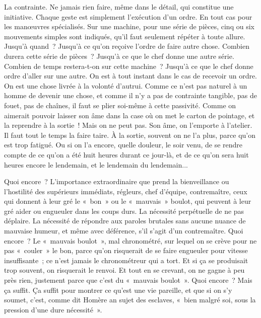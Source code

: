\documentclass[french,twoside]{book} %
\begin{document}
La contrainte. Ne jamais rien faire, même dans le détail, qui constitue une initiative. Chaque geste est simplement l'exécution d'un ordre. En tout cas pour les manœuvres spécialisés. Sur une machine, pour une série de pièces, cinq ou six mouvements simples sont indiqués, qu'il faut seulement répéter à toute allure. Jusqu'à quand ? Jusqu'à ce qu'on reçoive l'ordre de faire autre chose. Combien durera cette série de pièces ? Jusqu'à ce que le chef donne une autre série. Combien de temps restera-t-on sur cette machine ? Jusqu'à ce que le chef donne ordre d'aller sur une autre. On est à tout instant dans le cas de recevoir un ordre. On est une chose livrée à la volonté d'autrui. Comme ce n'est pas naturel à un homme de devenir une chose, et comme il n'y a pas de contrainte tangible, pas de fouet, pas de chaînes, il faut se plier soi-même à cette passivité. Comme on aimerait pouvoir laisser son âme dans la case où on met le carton de pointage, et la reprendre à la sortie ! Mais on ne peut pas. Son âme, on l'emporte à l'atelier. Il faut tout le temps la faire taire. À la sortie, souvent on ne l'a plus, parce qu'on est trop fatigué. Ou si on l'a encore, quelle douleur, le soir venu, de se rendre compte de ce qu'on a été huit heures durant ce jour-là, et de ce qu'on sera huit heures encore le lendemain, et le lendemain du lendemain...\par
Quoi encore ? L'importance extraordinaire que prend la bienveillance ou l'hostilité des supérieurs immédiats, régleurs, chef d'équipe, contremaître, ceux qui donnent à leur gré le « bon » ou le « mauvais » boulot, qui peuvent à leur gré aider ou engueuler dans les coups durs. La nécessité perpétuelle de ne pas déplaire. La nécessité de répondre aux paroles brutales sans aucune nuance de mauvaise humeur, et même avec déférence, s'il s'agit d'un contremaître. Quoi encore ? Le « mauvais boulot », mal chronométré, sur lequel on se crève pour ne pas « couler » le bon, parce qu'on risquerait de se faire engueuler pour vitesse insuffisante ; ce n'est jamais le chronométreur qui a tort. Et si ça se produisait trop souvent, on risquerait le renvoi. Et tout en se crevant, on ne gagne à peu près rien, justement parce que c'est du « mauvais boulot ». Quoi encore ? Mais ça suffit. Ça suffit pour montrer ce qu'est une vie pareille, et que si on s'y soumet, c'est, comme dit Homère an sujet des esclaves, « bien malgré soi, sous la pression d'une dure nécessité ».\par
\end{document}
